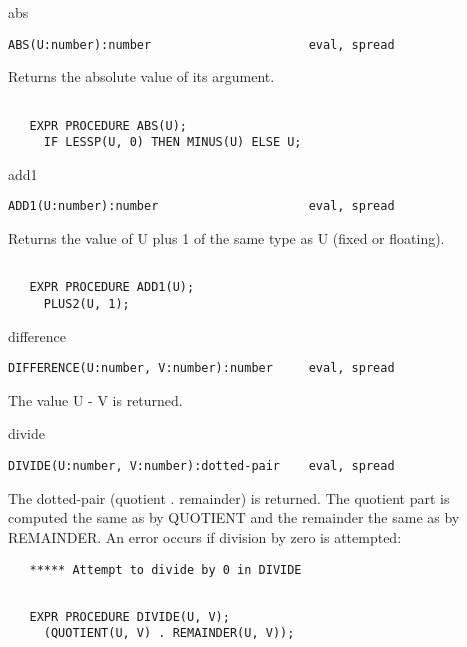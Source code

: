 \begin{Function}{abs}
\begin{verbatim}
ABS(U:number):number                      eval, spread
\end{verbatim}
   Returns the absolute value of its argument.
\begin{verbatim}

   EXPR PROCEDURE ABS(U);
     IF LESSP(U, 0) THEN MINUS(U) ELSE U;
\end{verbatim}

\end{Function}
\begin{Function}{add1}
\begin{verbatim}
ADD1(U:number):number                     eval, spread
\end{verbatim}
   Returns  the value of U plus 1 of the same type as U (fixed or
   floating).
\begin{verbatim}

   EXPR PROCEDURE ADD1(U);
     PLUS2(U, 1);
\end{verbatim}

\end{Function}
\begin{Function}{difference}
\begin{verbatim}
DIFFERENCE(U:number, V:number):number     eval, spread
\end{verbatim}
   The value U - V is returned.

\end{Function}
\begin{Function}{divide}
\begin{verbatim}
DIVIDE(U:number, V:number):dotted-pair    eval, spread
\end{verbatim}
   The  dotted-pair (quotient  .   remainder)  is returned.   The
   quotient  part is  computed the  same as  by QUOTIENT  and the
   remainder  the  same  as  by  REMAINDER.  An  error  occurs if
   division by zero is attempted:
\begin{verbatim}
   ***** Attempt to divide by 0 in DIVIDE
\end{verbatim}
\begin{verbatim}

   EXPR PROCEDURE DIVIDE(U, V);
     (QUOTIENT(U, V) . REMAINDER(U, V));
\end{verbatim}

\end{Function}
